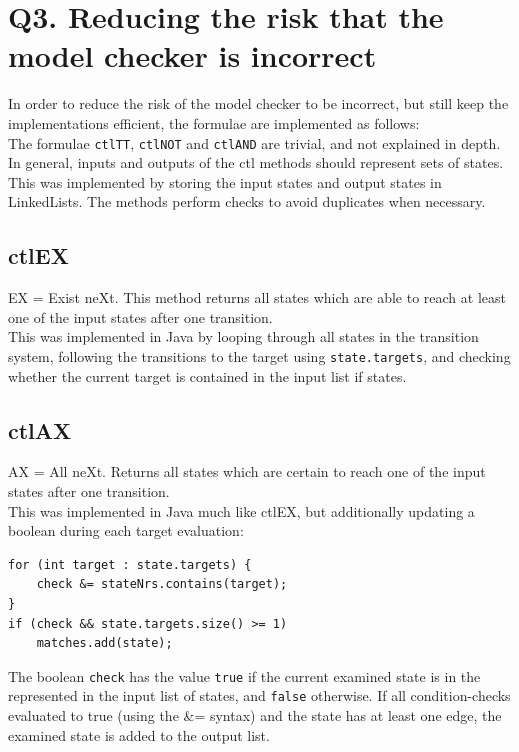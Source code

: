 \section{Q3. Reducing the risk that the model checker is incorrect}

In order to reduce the risk of the model checker to be incorrect, but still keep the implementations efficient, the formulae are implemented as follows:\\

The formulae \texttt{ctlTT}, \texttt{ctlNOT} and \texttt{ctlAND} are trivial, and not explained in depth. In general, inputs and outputs of the ctl methods should represent sets of states. This was implemented by storing the input states and output states in LinkedLists. The methods perform checks to avoid duplicates when necessary. 

\subsection{ctlEX}
EX = Exist neXt. This method returns all states which are able to reach at least one of the input states after one transition. \\

This was implemented in Java by looping through all states in the transition system, following the transitions to the target using \texttt{state.targets}, and checking whether the current target is contained in the input list if states.

\subsection{ctlAX}
AX = All neXt. Returns all states which are certain to reach one of the input states after one transition. \\

This was implemented in Java much like ctlEX, but additionally updating a boolean during each target evaluation:

\begin{lstlisting}
for (int target : state.targets) {
	check &= stateNrs.contains(target); 
}
if (check && state.targets.size() >= 1)
    matches.add(state);
\end{lstlisting}
The boolean \texttt{check} has the value \texttt{true} if the current examined state is in the represented in the input list of states, and \texttt{false} otherwise. If all condition-checks evaluated to true (using the \&= syntax) and the state has at least one edge, the examined state is added to the output list.

